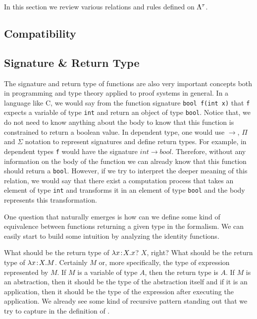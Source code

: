 In this section we review various relations and rules defined on $\Lambda^{\tau}$.

\subsection{Compatibility}



\subsection{\alphaequivalence}



\subsection{Signature \& Return Type}

The signature and return type of functions are also very important concepts both in programming and type theory applied to proof systems in general. In a language like C, we would say from the function signature \texttt{bool\ f(int x)} that \texttt{f} expects a variable of type \texttt{int} and return an object of type \texttt{bool}. Notice that, we do not need to know anything about the body to know that this function is constrained to return a boolean value. In dependent type, one would use $\to$, $\Pi$ and $\Sigma$ notation to represent signatures and define return types. For example, in dependent types \texttt{f} would have the signature $int \to bool$. Therefore, without any information on the body of the function we can already know that this function should return a \texttt{bool}. However, if we try to interpret the deeper meaning of this relation, we would say that there exist a computation process that takes an element of type \texttt{int} and transforms it in an element of type \texttt{bool} and the body represents this transformation.

One question that naturally emerges is how can we define some kind of equivalence between functions returning a given type in the \lambdatypes formalism. We can easily start to build some intuition by analyzing the identity functions.

What should be the return type of $\lambda x \nobreak\mskip2mu{:}\mskip2mu\nobreak X.x$? $X$, right? What should be the return type of $\lambda x \nobreak\mskip2mu{:}\mskip2mu\nobreak X.M$. Certainly $M$ or, more specifically, the type of expression represented by $M$. If $M$ is a variable of type $A$, then the return type is $A$. If $M$ is an abstraction, then it should be the type of the abstraction itself and if it is an application, then it should be the type of the expression after executing the application. We already see some kind of recursive pattern standing out that we try to capture in the definition of \sigmaequivalence.


